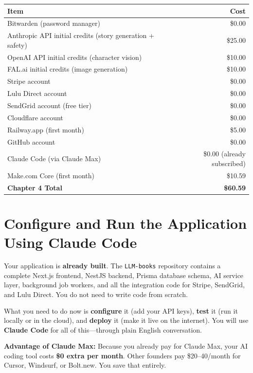 \documentclass[12pt, letterpaper, oneside]{book}
\begin{document}
\begin{table}[H]
\centering
\begin{tabular}{lr}
\toprule
\textbf{Item} & \textbf{Cost} \\
\midrule
Bitwarden (password manager) & \$0.00 \\
Anthropic API initial credits (story generation + safety) & \$25.00 \\
OpenAI API initial credits (character vision) & \$10.00 \\
FAL.ai initial credits (image generation) & \$10.00 \\
Stripe account & \$0.00 \\
Lulu Direct account & \$0.00 \\
SendGrid account (free tier) & \$0.00 \\
Cloudflare account & \$0.00 \\
Railway.app (first month) & \$5.00 \\
GitHub account & \$0.00 \\
Claude Code (via Claude Max) & \$0.00 (already subscribed) \\
Make.com Core (first month) & \$10.59 \\
\midrule
\textbf{Chapter 4 Total} & \textbf{\$60.59} \\
\bottomrule
\end{tabular}
\end{table}

\chapter{Configure and Run the Application Using Claude Code}

Your application is \textbf{already built}. The \texttt{LLM-books} repository contains a complete Next.js frontend, NestJS backend, Prisma database schema, AI service layer, background job workers, and all the integration code for Stripe, SendGrid, and Lulu Direct. You do not need to write code from scratch.

What you need to do now is \textbf{configure} it (add your API keys), \textbf{test} it (run it locally or in the cloud), and \textbf{deploy} it (make it live on the internet). You will use \textbf{Claude Code} for all of this---through plain English conversation.

\begin{successbox}
\textbf{Advantage of Claude Max:} Because you already pay for Claude Max, your AI coding tool costs \textbf{\$0 extra per month}. Other founders pay \$20--40/month for Cursor, Windsurf, or Bolt.new. You save that entirely.
\end{successbox}
\end{document}
